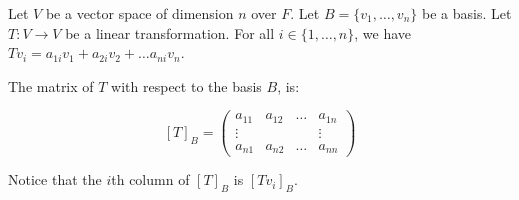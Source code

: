 \documentclass[twoside]{scrartcl}
\begin{document}
\begin{definition} Let $V$ be a vector space of dimension $n$ over $F$. Let $B = \{v_1,\dots,v_n\}$ be a basis. Let $T : V \to V$ be a linear transformation. For all $i \in \{1,\dots,n\}$, we have $Tv_i = a_{1i}v_1 + a_{2i}v_2 + \dots a_{ni}v_n$.

\noindent The matrix of $T$ with respect to the basis $B$, is:

\[[T]_B = \begin{pmatrix}
 a_{11} & a_{12} & \dots & a_{1n}\\
 \vdots & &  & \vdots \\
 a_{n1} & a_{n2} & \dots & a_{nn}
 \end{pmatrix}
\]
\end{definition}

Notice that the $i$th column of $[T]_B$ is $[Tv_i]_B$.\\
\end{document}
